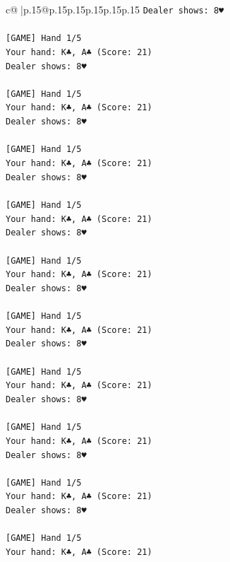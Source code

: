 \documentclass{article}
\begin{document}
{\begin{supertabular}{c@{$\;$}|p{.15\linewidth}@{}p{.15\linewidth}p{.15\linewidth}p{.15\linewidth}p{.15\linewidth}p{.15\linewidth}}
{{{\texttt{Dealer shows: 8♥} \\
\\ 
\texttt{{[}GAME{]} Hand 1/5} \\
\texttt{Your hand: K♣, A♣ (Score: 21)} \\
\texttt{Dealer shows: 8♥} \\
\\ 
\texttt{{[}GAME{]} Hand 1/5} \\
\texttt{Your hand: K♣, A♣ (Score: 21)} \\
\texttt{Dealer shows: 8♥} \\
\\ 
\texttt{{[}GAME{]} Hand 1/5} \\
\texttt{Your hand: K♣, A♣ (Score: 21)} \\
\texttt{Dealer shows: 8♥} \\
\\ 
\texttt{{[}GAME{]} Hand 1/5} \\
\texttt{Your hand: K♣, A♣ (Score: 21)} \\
\texttt{Dealer shows: 8♥} \\
\\ 
\texttt{{[}GAME{]} Hand 1/5} \\
\texttt{Your hand: K♣, A♣ (Score: 21)} \\
\texttt{Dealer shows: 8♥} \\
\\ 
\texttt{{[}GAME{]} Hand 1/5} \\
\texttt{Your hand: K♣, A♣ (Score: 21)} \\
\texttt{Dealer shows: 8♥} \\
\\ 
\texttt{{[}GAME{]} Hand 1/5} \\
\texttt{Your hand: K♣, A♣ (Score: 21)} \\
\texttt{Dealer shows: 8♥} \\
\\ 
\texttt{{[}GAME{]} Hand 1/5} \\
\texttt{Your hand: K♣, A♣ (Score: 21)} \\
\texttt{Dealer shows: 8♥} \\
\\ 
\texttt{{[}GAME{]} Hand 1/5} \\
\texttt{Your hand: K♣, A♣ (Score: 21)} \\
\texttt{Dealer shows: 8♥} \\
\\ 
\texttt{{[}GAME{]} Hand 1/5} \\
\texttt{Your hand: K♣, A♣ (Score: 21)} \\
}}}
\end{supertabular}}
\end{document}
